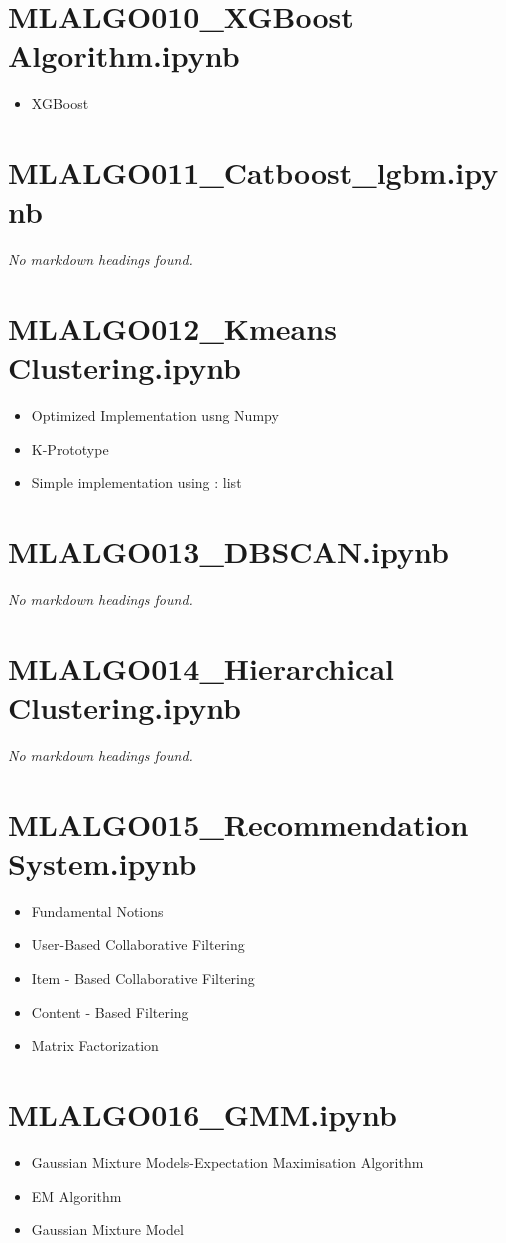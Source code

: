 \documentclass[11pt]{article}
\begin{document}
\section*{MLALGO010\_XGBoost Algorithm.ipynb}
\begin{itemize}
\item XGBoost
\end{itemize}
\section*{MLALGO011\_Catboost\_lgbm.ipynb}
\textit{No markdown headings found.}
\section*{MLALGO012\_Kmeans Clustering.ipynb}
\begin{itemize}
\item Optimized Implementation usng Numpy
\item K-Prototype
\item Simple implementation using : list
\end{itemize}
\section*{MLALGO013\_DBSCAN.ipynb}
\textit{No markdown headings found.}
\section*{MLALGO014\_Hierarchical Clustering.ipynb}
\textit{No markdown headings found.}
\section*{MLALGO015\_Recommendation System.ipynb}
\begin{itemize}
\item Fundamental Notions
\item User-Based Collaborative Filtering
\item Item - Based Collaborative Filtering
\item Content - Based Filtering
\item Matrix Factorization
\end{itemize}
\section*{MLALGO016\_GMM.ipynb}
\begin{itemize}
\item Gaussian Mixture Models-Expectation Maximisation Algorithm
\item EM Algorithm
\item Gaussian Mixture Model
\end{itemize}
\end{document}
